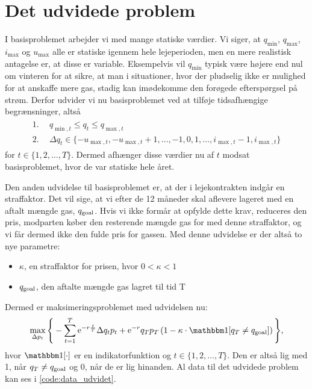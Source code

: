 \section{Det udvidede problem} \label{kap:udvidet_problem}

I basisproblemet arbejder vi med mange statiske værdier. Vi siger, at $q_{\min}$, $q_{\max}$, $i_{\max}$ og $u_{\max}$ alle er statiske igennem hele lejeperioden, men en mere realistisk antagelse er, at disse er variable. Eksempelvis vil $q_{\min}$ typisk være højere end nul om vinteren for at sikre, at man i situationer, hvor der pludselig ikke er mulighed for at anskaffe mere gas, stadig kan imødekomme den forøgede efterspørgsel på strøm. Derfor udvider vi nu basisproblemet ved at tilføje tidsafhængige begrænsninger, altså
\begin{align}
\begin{split}
\textrm{1.}& \ \ q_{\min,t} \leq q_{t} \leq q_{\max,t} \\
\textrm{2.}& \ \ \Delta q_{t} \in \{-u_{\max,t}, -u_{\max,t} + 1, \dotsc, -1, 0, 1, \dotsc, i_{\max,t} -1, i_{\max,t} \}
\end{split}
\end{align}
for $t \in \{1,2,\dotsc,T \}$. Dermed afhænger disse værdier nu af $t$ modsat basisproblemet, hvor de var statiske hele året. 

Den anden udvidelse til basisproblemet er, at der i lejekontrakten indgår en straffaktor. Det vil sige, at vi efter de 12 måneder skal aflevere lageret med en aftalt mængde gas, $q_{\textrm{goal}}$. Hvis vi ikke formår at opfylde dette krav, reduceres den pris, modparten køber den resterende mængde gas for med denne straffaktor, og vi får dermed ikke den fulde pris for gassen. Med denne udvidelse er der altså to nye parametre:
\begin{itemize}
\item $\kappa$, en straffaktor for prisen, hvor $0 < \kappa < 1$
\item $q_{\textrm{goal}}$, den aftalte mængde gas lagret til tid T
\end{itemize}
Dermed er maksimeringsproblemet med udvidelsen nu:
\begin{equation}
\max_{\Delta p_{t}} \Bigg\{ -\sum_{t=1}^{T} \mathrm{e}^{-r\frac{t}{T}} \Delta q_{t} p_{t}+ \mathrm{e}^{-r}q_{T}p_{T} \left (1- \kappa \cdot \ind [q_{T} \neq q_{\goal}] \right )  \Bigg\}, 
\end{equation}
hvor $\ind [\cdot]$ er en indikatorfunktion og $t \in \{1,2,\dotsc,T \}$. Den er altså lig med 1, når $q_{T} \neq q_{\textrm{goal}}$ og 0, når de er lig hinanden. Al data til det udvidede problem kan ses i \autoref{code:data_udvidet}.